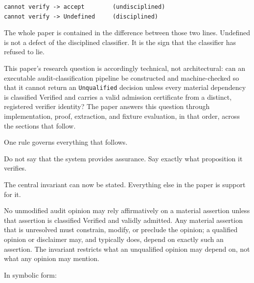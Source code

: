 \documentclass[smallcondensed,envcountsect,natbib]{svjour3}
\newcommand{\state}[1]{\textsf{#1}}
\begin{document}
\begin{lstlisting}
cannot verify -> accept        (undisciplined)
cannot verify -> Undefined     (disciplined)
\end{lstlisting}

The whole paper is contained in the difference between those two lines. \state{Undefined} is not a defect of the disciplined classifier. It is the sign that the classifier has refused to lie.

This paper's research question is accordingly technical, not architectural: can an executable audit-classification pipeline be constructed and machine-checked so that it cannot return an \texttt{Unqualified} decision unless every material dependency is classified \state{Verified} and carries a valid admission certificate from a distinct, registered verifier identity? The paper answers this question through implementation, proof, extraction, and fixture evaluation, in that order, across the sections that follow.

One rule governs everything that follows.

\begin{rul}
\label{rule:proposition}
Do not say that the system provides assurance. Say exactly what proposition it verifies.
\end{rul}

The central invariant can now be stated. Everything else in the paper is support for it.

\begin{rul}
\label{rule:invariant}
No unmodified audit opinion may rely affirmatively on a material assertion unless that assertion is classified Verified and validly admitted. Any material assertion that is unresolved must constrain, modify, or preclude the opinion; a qualified opinion or disclaimer may, and typically does, depend on exactly such an assertion. The invariant restricts what an unqualified opinion may depend on, not what any opinion may mention.
\end{rul}

In symbolic form:
\end{document}

